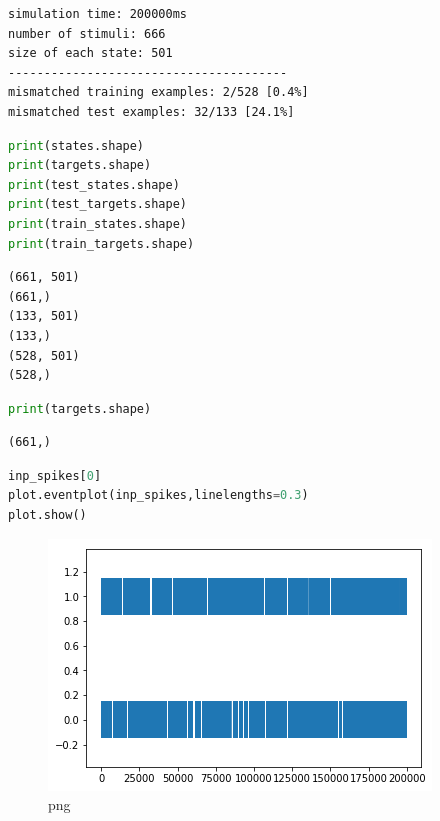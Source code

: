 \begin{lstlisting}
simulation time: 200000ms
number of stimuli: 666
size of each state: 501
---------------------------------------
mismatched training examples: 2/528 [0.4%]
mismatched test examples: 32/133 [24.1%]
\end{lstlisting}

\begin{lstlisting}[language=Python]
print(states.shape)
print(targets.shape)
print(test_states.shape)
print(test_targets.shape)
print(train_states.shape)
print(train_targets.shape)
\end{lstlisting}

\begin{lstlisting}
(661, 501)
(661,)
(133, 501)
(133,)
(528, 501)
(528,)
\end{lstlisting}

\begin{lstlisting}[language=Python]
print(targets.shape)
\end{lstlisting}

\begin{lstlisting}
(661,)
\end{lstlisting}

\begin{lstlisting}[language=Python]
inp_spikes[0]
plot.eventplot(inp_spikes,linelengths=0.3)     
plot.show()
\end{lstlisting}

\begin{figure}
\centering
\includegraphics{olfactory_files/olfactory_8_0.png}
\caption{png}
\end{figure}

